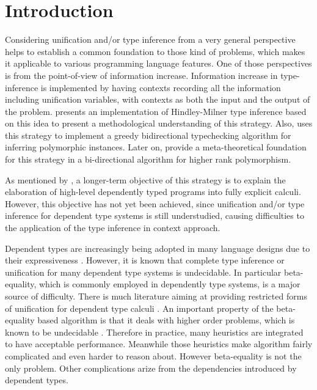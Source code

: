 \section{Introduction}

Considering unification and/or type inference from a very general perspective
helps to establish a common foundation to those kind of problems, which makes it
applicable to various programming language features. One of those
perspectives is from the point-of-view of information 
increase. Information increase in type-inference is implemented by having contexts recording all the
information including unification variables, with contexts as both the input and
the output of the problem. \citet{gundry2010type} presents an implementation of
Hindley-Milner \citep{damas1982principal,hindley69principal} type inference
based on this idea to present a methodological understanding of this strategy.
Also, \citet{dunfield2009greedy} uses this strategy to implement a greedy
bidirectional typechecking algorithm for inferring polymorphic instances. Later
on, \citet{dunfield2013complete} provide a meta-theoretical 
foundation for this strategy in a
bi-directional algorithm for higher rank polymorphism.

As mentioned by \citet{gundry2010type}, a longer-term objective of this strategy
is to explain the elaboration of high-level dependently typed programs into
fully explicit calculi. However, this objective has not yet been
achieved, since unification and/or type inference
for dependent type systems is still understudied, causing difficulties
to the application of the type inference in context approach.

Dependent types are increasingly being adopted in many language designs due to
their expressiveness \citep{xi1999dependent, licata2005formulation,
  pasalic2006concoqtion, mckinna2006dependent, norell2009dependently,
  brady2013idris}. However, it is known that complete type inference or
unification for many dependent type systems is undecidable. In particular 
beta-equality, which is commonly employed in dependently type systems, is a
major source of difficulty. There is much literature aiming at providing
restricted forms of unification for dependent type calculi
\citep{ziliani2015unification, abel2011higher, elliott1989higher}. An important
property of the beta-equality based algorithm is that it deals with higher order
problems, which is known to be undecidable \citep{goldfarb1981undecidability}.
Therefore in practice, many heuristics are integrated to have acceptable
performance. Meanwhile those heuristics make algorithm fairly complicated
and even harder to reason about. However beta-equality is not the
only problem. Other complications arize from the dependencies introduced by
dependent types.

